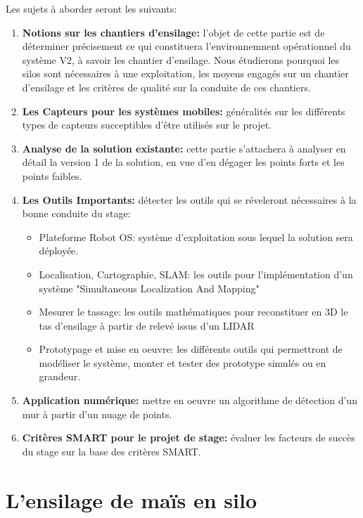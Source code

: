 \documentclass[12pt,a4paper]{report}
\begin{document}
Les sujets à aborder seront les suivants:
\begin{enumerate}[label=\textbf{\arabic*.}]
	\item \textbf{Notions sur les chantiers d'ensilage:} l'objet de cette partie est de déterminer précisement ce qui constituera l'environnemnent opérationnel du système V2, à savoir les chantier d'ensilage. Nous étudierons pourquoi les silos sont nécessaires à une exploitation, les moyens engagés sur un chantier d'ensilage et les critères de qualité sur la conduite de ces chantiers. 
		
	\item \textbf{Les Capteurs pour les systèmes mobiles:} généralités sur les différents types de capteurs succeptibles d'être utilisés sur le projet.
	
	\item \textbf{Analyse de la solution existante:} cette partie s'attachera à analyser en détail la version 1 de la solution, en vue d'en dégager les points forts et les points faibles.


	\item \textbf{Les Outils Importants:} détecter les outils qui se réveleront nécessaires à la bonne conduite du stage:
	\begin{itemize}
		\item Plateforme Robot OS: système d'exploitation sous lequel la solution sera déployée.
		\item Localisation, Cartographie, SLAM: les outils pour l'implémentation d'un système "Simultaneous Localization And Mapping"
		\item Mesurer le tassage: les outils mathématiques pour reconstituer en 3D le tas d'ensilage à partir de relevé issus d'un LIDAR
		\item Prototypage et mise en oeuvre: les différents outils qui permettront de modéliser le système, monter et tester des prototype simulés ou en grandeur.
	\end{itemize}
	
	\item \textbf{Application numérique:} mettre en oeuvre un algorithme de détection d'un mur à partir d'un nuage de points.
	
	\item \textbf{Critères SMART pour le projet de stage:} évaluer les facteurs de succès du stage sur la base des critères SMART.
\end{enumerate}

\chapter{L'ensilage de maïs en silo}
\end{document}

